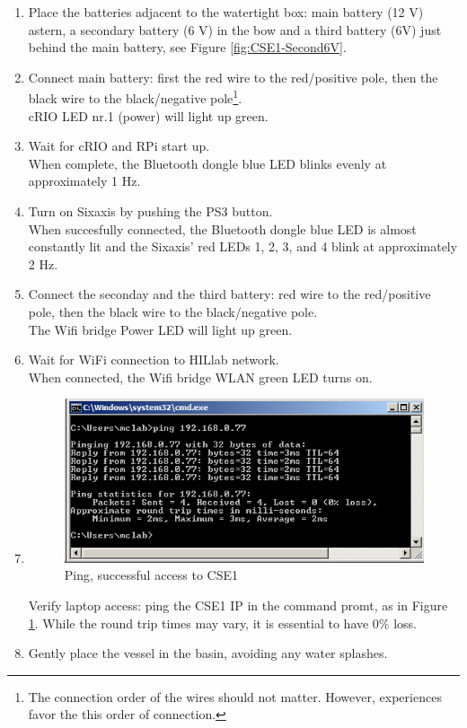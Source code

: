 \documentclass[a4paper,twoside,english]{report}
\begin{document}
\begin{enumerate}
\item Place the batteries adjacent to the watertight box: main battery (12
V) astern, a secondary battery (6 V) in the bow and a third battery
(6V) just behind the main battery, see Figure \ref{fig:CSE1-Second6V}.
\item Connect main battery: first the red wire to the red/positive pole,
then the black wire to the black/negative pole\footnote{The connection order of the wires should not matter. However, experiences
favor the this order of connection.}.\\
cRIO LED nr.1 (power) will light up green.
\item Wait for cRIO and RPi start up.\\
When complete, the Bluetooth dongle blue LED blinks evenly at approximately
1 Hz.
\item Turn on Sixaxis by pushing the PS3 button.\\
When succesfully connected, the Bluetooth dongle blue LED is almost
constantly lit and the Sixaxis' red LEDs 1, 2, 3, and 4 blink at approximately
2 Hz.
\item Connect the seconday and the third battery: red wire to the red/positive
pole, then the black wire to the black/negative pole.\\
The Wifi bridge Power LED will light up green.
\item Wait for WiFi connection to HILlab network.\\
When connected, the Wifi bridge WLAN green LED turns on.
\item 
\begin{figure}[h]
\centering \includegraphics[scale=0.45]{fig/cRIO_ping} \caption{\label{fig: ping}Ping, successful access to CSE1}
\end{figure}
Verify laptop access: ping the CSE1 IP in the command promt, as in
Figure \ref{fig: ping}. While the round trip times may vary, it is
essential to have 0\% loss.
\item Gently place the vessel in the basin, avoiding any water splashes.
\end{enumerate}
\end{document}

